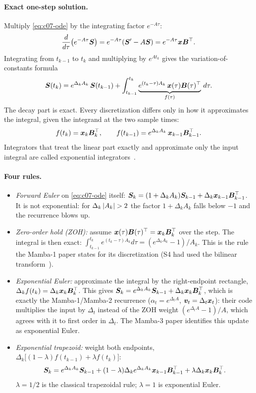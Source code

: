 \paragraph{Exact one-step solution.} Multiply \cref{eq:c07-ode} by the integrating factor
$e^{-A\tau}$:
\[
  \frac{d}{d\tau}\bigl(e^{-A\tau}\bm{S}\bigr) = e^{-A\tau}(\bm{S}' - A\bm{S}) = e^{-A\tau}\bm{x}\bm{B}^{\top} .
\]
Integrating from $t_{k-1}$ to $t_k$ and multiplying by $e^{At_k}$ gives the
variation-of-constants formula
\begin{equation}\label{eq:c07-voc}
  \bm{S}(t_k) = e^{\Delta_kA_k}\,\bm{S}(t_{k-1}) + \int_{t_{k-1}}^{t_k} \underbrace{e^{(t_k-\tau)A_k}\,\bm{x}(\tau)\bm{B}(\tau)^{\top}}_{f(\tau)}\, d\tau .
\end{equation}
The decay part is exact. Every discretization differs only in how it approximates the
integral, given the integrand at the two sample times:
\[
  f(t_k) = \bm{x}_k\bm{B}_k^{\top}, \qquad f(t_{k-1}) = e^{\Delta_kA_k}\,\bm{x}_{k-1}\bm{B}_{k-1}^{\top} .
\]
Integrators that treat the linear part exactly and approximate only the input integral are
called exponential integrators~\citep{c07-hochbruck2010exponential}.

\paragraph{Four rules.}
\begin{itemize}
\item \emph{Forward Euler} on \cref{eq:c07-ode} itself:
  $\bm{S}_k = (1+\Delta_kA_k)\bm{S}_{k-1} + \Delta_k\bm{x}_{k-1}\bm{B}_{k-1}^{\top}$. It is not exponential:
  for $\Delta_k\left\lvert A_k\right\rvert > 2$ the factor $1+\Delta_kA_k$ falls below $-1$ and the recurrence
  blows up.
\item \emph{Zero-order hold (ZOH):} assume $\bm{x}(\tau)\bm{B}(\tau)^{\top} = \bm{x}_k\bm{B}_k^{\top}$ over the
  step. The integral is then exact:
  $\int_{t_{k-1}}^{t_k} e^{(t_k-\tau)A_k}d\tau = (e^{\Delta_kA_k}-1)/A_k$. This is the rule the
  Mamba-1 paper states for its discretization (S4 had used the bilinear
  transform~\citep{c03-gu2022s4}).
\item \emph{Exponential Euler:} approximate the integral by the right-endpoint rectangle,
  $\Delta_k f(t_k) = \Delta_k\bm{x}_k\bm{B}_k^{\top}$. This gives
  $\bm{S}_k = e^{\Delta_kA_k}\bm{S}_{k-1} + \Delta_k\bm{x}_k\bm{B}_k^{\top}$, which is exactly the
  Mamba-1/Mamba-2 recurrence ($\alpha_t = e^{\Delta_tA}$, $\bm{v}_t = \Delta_t\bm{x}_t$): their code
  multiplies the input by $\Delta_t$ instead of the ZOH weight $(e^{\Delta_tA}-1)/A$, which
  agrees with it to first order in $\Delta_t$. The Mamba-3 paper identifies this update as
  exponential Euler.
\item \emph{Exponential trapezoid:} weight both endpoints,
  $\Delta_k\bigl[(1-\lambda)f(t_{k-1}) + \lambda f(t_k)\bigr]$:
  \begin{equation}\label{eq:c07-trap}
    \bm{S}_k = e^{\Delta_kA_k}\bm{S}_{k-1} + (1-\lambda)\Delta_k e^{\Delta_kA_k}\bm{x}_{k-1}\bm{B}_{k-1}^{\top} + \lambda\Delta_k\bm{x}_k\bm{B}_k^{\top} .
  \end{equation}
  $\lambda = 1/2$ is the classical trapezoidal rule; $\lambda = 1$ is exponential Euler.
\end{itemize}

